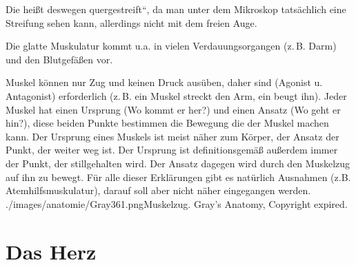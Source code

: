 \noindent Die  heißt deswegen
{\quotedblbase}quergestreift{\textquotedblleft}, da man unter dem
Mikroskop tatsächlich eine Streifung sehen kann, allerdings nicht mit
dem freien Auge. 

Die glatte Muskulatur kommt u.a. in vielen
Verdauungsorgangen (z.\,B. Darm) und den Blutgefäßen vor.

{%
Muskel können nur Zug und keinen
Druck ausüben, daher sind  (Agonist u.
Antagonist) erforderlich (z.\,B. ein Muskel streckt den Arm,
ein  beugt ihn). Jeder Muskel hat einen Ursprung (Wo kommt er her?)
und einen Ansatz (Wo geht er hin?), diese beiden Punkte bestimmen die Bewegung
die der Muskel machen kann. Der Ursprung eines Muskels ist meist näher zum
Körper, der Ansatz der Punkt, der weiter weg ist. Der Ursprung ist
definitionsgemäß außerdem immer der Punkt, der stillgehalten wird. Der Ansatz
dagegen wird durch den Muskelzug auf ihn zu bewegt. Für alle dieser Erklärungen
gibt es natürlich Ausnahmen (z.B. Atemhilfsmuskulatur), darauf soll aber nicht
näher eingegangen werden.} {}
{./images/anatomie/Gray361.png}{\AuthNotesPicLegalOk{}{}Muskelzug. }{Gray's Anatomy, Copyright expired.}






\clearpage
\section{Das Herz}

